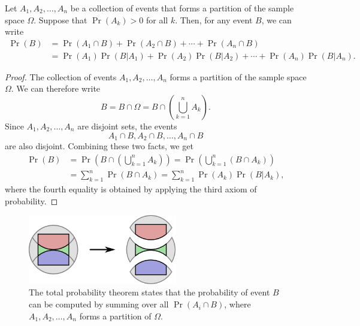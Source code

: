 \begin{theorem} \label{theorem:TotalProbability} 
Let $A_1, A_2, \ldots, A_n$ be a collection of events that forms a partition of the sample space $\Omega$.
Suppose that $\Pr (A_k) > 0$ for all $k$.
Then, for any event $B$, we can write
\begin{equation*}
\begin{split}
\Pr (B) &= \Pr (A_1 \cap B) + \Pr (A_2 \cap B) + \cdots + \Pr (A_n \cap B) \\
&= \Pr (A_1) \Pr (B | A_1) + \Pr (A_2) \Pr (B | A_2) + \cdots + \Pr (A_n) \Pr (B | A_n ) .
\end{split}
\end{equation*}
\end{theorem}
\begin{proof}
The collection of events $A_1, A_2, \ldots, A_n$ forms a partition of the sample space $\Omega$.
We can therefore write
\begin{equation*}
B = B \cap \Omega = B \cap \left( \bigcup_{k=1}^n A_k \right) .
\end{equation*}
Since $A_1, A_2, \ldots, A_n$ are disjoint sets, the events
\begin{equation*}
A_1 \cap B, A_2 \cap B, \ldots, A_n \cap B
\end{equation*}
are also disjoint.
Combining these two facts, we get
\begin{equation*}
\begin{split}
\Pr (B)
&= \Pr \left( B \cap \left( \bigcup_{k=1}^n A_k \right) \right)
= \Pr \left( \bigcup_{k=1}^n (B \cap A_k) \right) \\
&= \sum_{k=1}^n \Pr \left( B \cap A_k \right)
= \sum_{k=1}^n \Pr (A_k) \Pr \left( B |A_k \right) ,
\end{split}
\end{equation*}
where the fourth equality is obtained by applying the third axiom of probability.
\end{proof}

\begin{figure}[htb!]
\begin{center}
\includegraphics[height=3.034cm]{Figures/3Chapter/setpartition3}
\caption{The total probability theorem states that the probability of event $B$ can be computed by summing over all $\Pr(A_i \cap B)$, where $A_1, A_2, \ldots, A_n$ forms a partition of $\Omega$.}
\label{figure:SetPartition3}
\end{center}
\end{figure}


